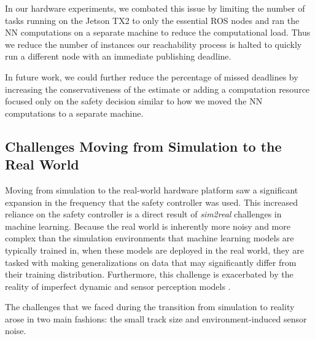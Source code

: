 \documentclass[manuscript,screen,review]{acmart}
\begin{document}
In our hardware experiments, we combated this issue by limiting the number of tasks running on the Jetson TX2 to only the essential ROS nodes and ran the NN computations on a separate machine to reduce the computational load. Thus we reduce the number of instances our reachability process is halted to quickly run a different node with an immediate publishing deadline. 

In future work, we could further reduce the percentage of missed deadlines by increasing the conservativeness of the estimate or adding a computation resource focused only on the safety decision similar to how we moved the NN computations to a separate machine.


\subsection{Challenges Moving from Simulation to the Real World}

Moving from simulation to the real-world hardware platform saw a significant expansion in the frequency that the safety controller was used. This increased reliance on the safety controller is a direct result of \emph{sim2real} challenges in machine learning. Because the real world is inherently more noisy and more complex than the simulation environments that machine learning models are typically trained in, when these models are deployed in the real world, they are tasked with making generalizations on data that may significantly differ from their training distribution. Furthermore, this challenge is exacerbated by the reality of imperfect dynamic and sensor perception models \cite{ivanov2020case}.

The challenges that we faced during the transition from simulation to reality arose in two main fashions: the small track size and environment-induced sensor noise.
\end{document}
